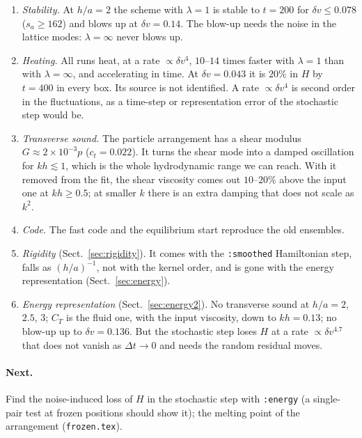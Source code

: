 \documentclass[11pt,aps,preprint,nofootinbib,superscriptaddress,tightenlines]{revtex4-2}
\def\Sect#1{Sect.~\ref{#1}}
\let\oldparagraph\paragraph
\renewcommand{\paragraph}{\par\bigskip\oldparagraph}
\begin{document}
\begin{enumerate}
\item \emph{Stability.}  At $h/a=2$ the scheme with $\lambda=1$ is stable to $t=200$ for
  $\delta v\le0.078$ ($s_a\ge162$) and blows up at $\delta v=0.14$.  The blow-up needs the
  noise in the lattice modes: $\lambda=\infty$ never blows up.
\item \emph{Heating.}  All runs heat, at a rate $\propto\delta v^4$, $10$--$14$ times faster
  with $\lambda=1$ than with $\lambda=\infty$, and accelerating in time.  At $\delta v=0.043$
  it is $20\%$ in $H$ by $t=400$ in every box.  Its source is not identified.  A rate
  $\propto\delta v^4$ is second order in the fluctuations, as a time-step or
  representation error of the stochastic step would be.
\item \emph{Transverse sound.}  The particle arrangement has a shear modulus $G\approx2\times
  10^{-3}p$ ($c_t=0.022$).  It turns the shear mode into a damped oscillation for $kh\lesssim
  1$, which is the whole hydrodynamic range we can reach.  With it removed from the fit, the
  shear viscosity comes out $10$--$20\%$ above the input one at $kh\ge0.5$; at smaller $k$
  there is an extra damping that does not scale as $k^2$.
\item \emph{Code.}  The fast code and the equilibrium start reproduce the old ensembles.

\item \emph{Rigidity} (\Sect{sec:rigidity}).  It comes with the \texttt{:smoothed} Hamiltonian
  step, falls as $(h/a)^{-1}$, not with the kernel order, and is gone with the energy
  representation (\Sect{sec:energy}).
\item \emph{Energy representation} (\Sect{sec:energy2}).  No transverse sound at $h/a=2$, $2.5$,
  $3$; $C_T$ is the fluid one, with the input viscosity, down to $kh=0.13$; no blow-up up to $\delta v=0.136$.  But the stochastic step loses $H$ at a rate $\propto
  \delta v^{4.7}$ that does not vanish as $\Delta t\to0$ and needs the random residual moves.
\end{enumerate}

\paragraph{Next.}\label{sec:next}  Find the noise-induced loss of $H$ in the stochastic step with
\texttt{:energy} (a single-pair test at frozen positions should show it); the melting point of
the arrangement (\texttt{frozen.tex}).
\end{document}

